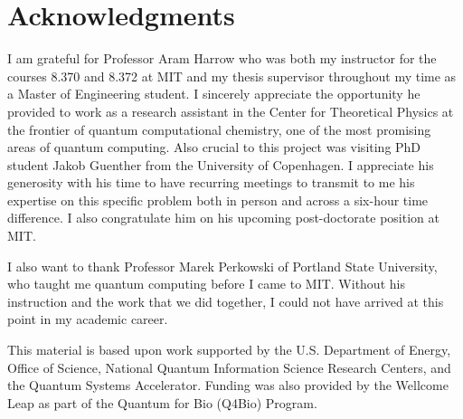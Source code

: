 

\chapter*{Acknowledgments}

I am grateful for Professor Aram Harrow who was both my instructor for the courses 8.370 and 8.372 at MIT and my thesis supervisor throughout my time as a Master of Engineering student. I sincerely appreciate the opportunity he provided to work as a research assistant in the Center for Theoretical Physics at the frontier of quantum computational chemistry, one of the most promising areas of quantum computing. Also crucial to this project was visiting PhD student Jakob Guenther from the University of Copenhagen. I appreciate his generosity with his time to have recurring meetings to transmit to me his expertise on this specific problem both in person and across a six-hour time difference. I also congratulate him on his upcoming post-doctorate position at MIT.

I also want to thank Professor Marek Perkowski of Portland State University, who taught me quantum computing before I came to MIT. Without his instruction and the work that we did together, I could not have arrived at this point in my academic career.

This material is based upon work supported by the U.S. Department of Energy, Office of Science, National Quantum Information Science Research Centers, and the Quantum Systems Accelerator. Funding was also provided by the Wellcome Leap as part of the Quantum for Bio (Q4Bio) Program.
